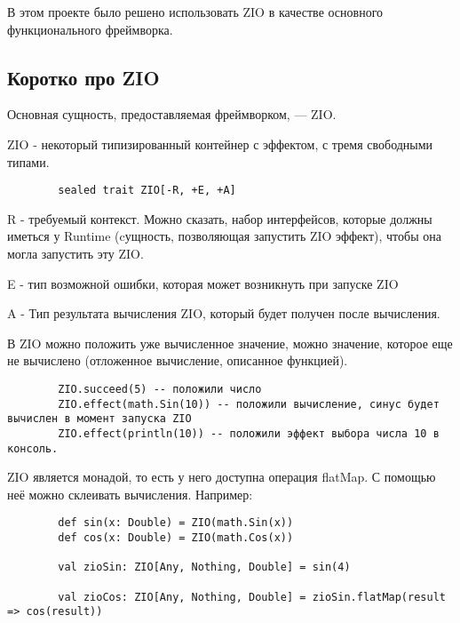 \documentclass[14pt]{extarticle}
\begin{document}
    В этом проекте было решено использовать ZIO в качестве основного функционального фреймворка.

    \subsection{Коротко про ZIO}
    Основная сущность, предоставляемая фреймворком, --- ZIO.

    ZIO - некоторый типизированный контейнер с эффектом, с тремя свободными типами.

    \begin{verbatim}
        sealed trait ZIO[-R, +E, +A]
    \end{verbatim}

    R - требуемый контекст. Можно сказать, набор интерфейсов, которые должны иметься у Runtime (cущность, позволяющая
    запустить ZIO эффект), чтобы она могла запустить эту ZIO.

    E - тип возможной ошибки, которая может возникнуть при запуске ZIO

    A - Тип результата вычисления ZIO, который будет получен после вычисления.

    В ZIO можно положить уже вычисленное значение, можно значение, которое еще не вычислено (отложенное вычисление,
    описанное функцией).

    \begin{verbatim}
        ZIO.succeed(5) -- положили число
        ZIO.effect(math.Sin(10)) -- положили вычисление, синус будет вычислен в момент запуска ZIO
        ZIO.effect(println(10)) -- положили эффект выбора числа 10 в консоль.
    \end{verbatim}

    ZIO является монадой, то есть у него доступна операция flatMap. С помощью неё можно склеивать вычисления. Например:

    \begin{verbatim}
        def sin(x: Double) = ZIO(math.Sin(x))
        def cos(x: Double) = ZIO(math.Cos(x))

        val zioSin: ZIO[Any, Nothing, Double] = sin(4)

        val zioCos: ZIO[Any, Nothing, Double] = zioSin.flatMap(result => cos(result))
    \end{verbatim}
\end{document}
